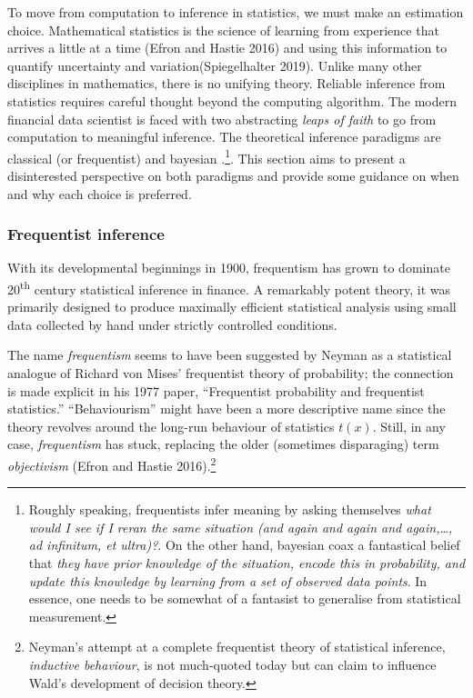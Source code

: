 \documentclass{article}
\begin{document}
To move from computation to inference in statistics, we must make an
estimation choice. Mathematical statistics is the science of learning
from experience that arrives a little at a time (Efron and Hastie 2016)
and using this information to quantify uncertainty and
variation(Spiegelhalter 2019). Unlike many other disciplines in
mathematics, there is no unifying theory. Reliable inference from
statistics requires careful thought beyond the computing algorithm. The
modern financial data scientist is faced with two abstracting
\emph{leaps of faith} to go from computation to meaningful inference.
The theoretical inference paradigms are classical (or frequentist) and
bayesian .\footnote{Roughly speaking, frequentists infer meaning by
  asking themselves \emph{what would I see if I reran the same situation
  (and again and again and again,\ldots, ad infinitum, et ultra)?}. On
  the other hand, bayesian coax a fantastical belief that \emph{they
  have prior knowledge of the situation, encode this in probability, and
  update this knowledge by learning from a set of observed data points}.
  In essence, one needs to be somewhat of a fantasist to generalise from
  statistical measurement.}. This section aims to present a
disinterested perspective on both paradigms and provide some guidance on
when and why each choice is preferred.

\hypertarget{frequentist-inference}{%
\subsubsection{Frequentist inference}\label{frequentist-inference}}

With its developmental beginnings in 1900, frequentism has grown to
dominate 20\textsuperscript{th} century statistical inference in
finance. A remarkably potent theory, it was primarily designed to
produce maximally efficient statistical analysis using small data
collected by hand under strictly controlled conditions.

The name \emph{frequentism} seems to have been suggested by Neyman as a
statistical analogue of Richard von Mises' frequentist theory of
probability; the connection is made explicit in his 1977 paper,
``Frequentist probability and frequentist statistics.'' ``Behaviourism''
might have been a more descriptive name since the theory revolves around
the long-run behaviour of statistics \(t(x)\). Still, in any case,
\emph{frequentism} has stuck, replacing the older (sometimes
disparaging) term \emph{objectivism} (Efron and Hastie 2016).\footnote{Neyman's
  attempt at a complete frequentist theory of statistical inference,
  \emph{inductive behaviour}, is not much-quoted today but can claim to
  influence Wald's development of decision theory.}
\end{document}
